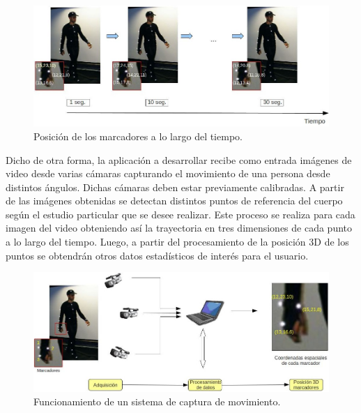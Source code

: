 \begin{figure}[H]
\begin{center}
\includegraphics[scale=0.4]{img/Sistema_completo/diagrama_abuelas_2.jpg}
\end{center}
\caption{Posición de los marcadores a lo largo del tiempo.}
\label{abuela2}
\end{figure}

Dicho de otra forma, la aplicación a desarrollar recibe como entrada imágenes de video desde varias cámaras capturando el movimiento de una persona desde distintos ángulos. Dichas cámaras deben estar previamente calibradas. A partir de las imágenes obtenidas se detectan distintos puntos de referencia del cuerpo según el estudio particular que se desee realizar. Este proceso se realiza para cada imagen del video obteniendo así la trayectoria en tres dimensiones de cada punto a lo largo del tiempo. Luego, a partir del procesamiento de la posición 3D de los puntos se obtendrán otros datos estadísticos de interés para el usuario.

\begin{figure}[H]
\begin{center}
\includegraphics[scale=0.4]{img/Sistema_completo/diagrama_abuelas_1.jpg}
\end{center}
\caption{Funcionamiento de un sistema de captura de movimiento.}
\label{abuela1}
\end{figure}

\vspace{5 mm}

